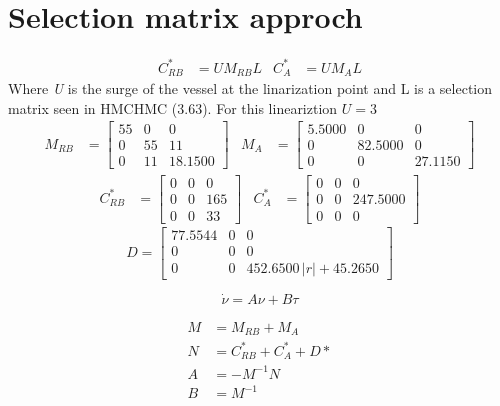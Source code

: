 \documentclass[12pt,a4]{article}
\begin{document}
\section{Selection matrix approch}

\begin{align}
	C^*_{RB} & = UM_{RB}L
	         &
	C^*_{A}  & = UM_AL
\end{align}
Where \textit{U} is the surge of the vessel at the linarization point and L is a selection matrix seen in HMCHMC (3.63).
For this lineariztion $U=3$
\begin{align}
	M_{RB} & = \left[\begin{array}{ccc} 55 & 0 & 0\\ 0 & 55 & 11\\ 0 & 11 & 18.1500 \end{array}\right]
	       &
	M_{A}  & = \left[\begin{array}{ccc} 5.5000 & 0 & 0\\ 0 & 82.5000 & 0\\ 0 & 0 & 27.1150 \end{array}\right]
\end{align}
\begin{align}
	C^*_{RB} & = \left[\begin{array}{ccc} 0 & 0 & 0\\ 0 & 0 & 165\\ 0 & 0 & 33 \end{array}\right]
	         &
	C^*_{A}  & = \left[\begin{array}{ccc} 0 & 0 & 0\\ 0 & 0 & 247.5000\\ 0 & 0 & 0 \end{array}\right]
\end{align}
\begin{equation}
	D = \left[\begin{array}{ccc} 77.5544 & 0 & 0\\ 0 & 0 & 0\\ 0 & 0 & 452.6500\,\left|r\right|+45.2650 \end{array}\right]
\end{equation}

\begin{equation}
	\dot{\nu} = A \nu + B \tau
\end{equation}

\begin{align}
	M & = M_{RB} + M_A            \\
	N & = C^*_{RB} + C^*_{A} + D* \\
	A & = -M^{-1}N                \\
	B & = M^{-1}
\end{align}
\end{document}
